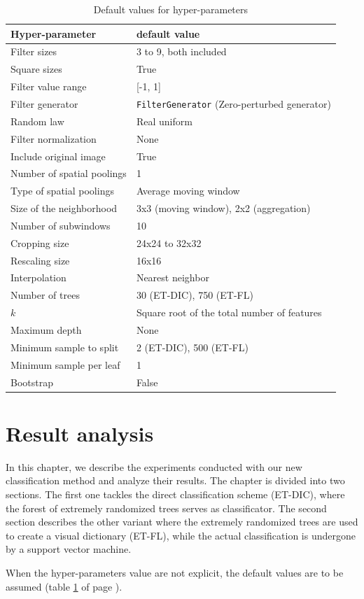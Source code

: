 \documentclass[a4paper]{report}
\begin{document}
	\begin{table}
		\centering
			\begin{tabular}{l|l}
			\hline
			Hyper-parameter & default value \\
			\hline
			Filter sizes & 3 to 9, both included\\
			Square sizes & True \\
			Filter value range & [-1, 1] \\
			Filter generator & \texttt{FilterGenerator} (Zero-perturbed generator)\\
			Random law & Real uniform\\
			Filter normalization & None\\
			Include original image & True\\
			Number of spatial poolings & 1 \\
			Type of spatial poolings & Average moving window \\
			Size of the neighborhood & 3x3 (moving window), 2x2 (aggregation)\\
			Number of subwindows & 10 \\
			Cropping size & 24x24 to 32x32 \\
			Rescaling size & 16x16 \\
			Interpolation & Nearest neighbor \\
			Number of trees & 30 (ET-DIC), 750 (ET-FL) \\
			$k$ & Square root of the total number of features \\
			Maximum depth & None \\
			Minimum sample to split & 2 (ET-DIC), 500 (ET-FL) \\
			Minimum sample per leaf & 1 \\
			Bootstrap & False \\
			\hline
			\end{tabular}
		\caption{Default values for hyper-parameters}
		\label{tab:DefaultValuesForHyperParameters}
	\end{table}
		


\chapter{Result analysis}
In this chapter, we describe the experiments conducted with our new classification method and analyze their results. The chapter is divided into two sections. The first one tackles the direct classification scheme (ET-DIC), where the forest of extremely randomized trees serves as classificator. The second section describes the other variant where the extremely randomized trees are used to create a visual dictionary (ET-FL), while the actual classification is undergone by a support vector machine.
\par
When the hyper-parameters value are not explicit, the default values are to be assumed (table \ref{tab:DefaultValuesForHyperParameters} of page \pageref{tab:DefaultValuesForHyperParameters}).
\end{document}
